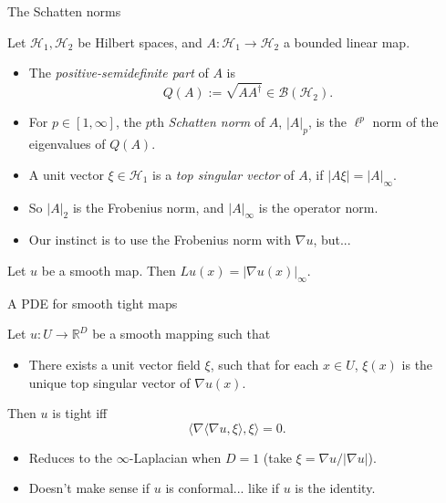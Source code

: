 \documentclass[10pt]{beamer}
\newcommand{\RR}{\mathbb{R}}
\begin{document}
\begin{frame}{The Schatten norms}
\begin{definition}
Let $\mathcal H_1, \mathcal H_2$ be Hilbert spaces, and $A: \mathcal H_1 \to \mathcal H_2$ a bounded linear map.
\begin{itemize}
\item The \emph{positive-semidefinite part} of $A$ is
$$Q(A) := \sqrt{AA^\dagger} \in \mathcal B(\mathcal H_2).$$
\item For $p \in [1, \infty]$, the $p$th \emph{Schatten norm} of $A$, $|A|_p$, is the $\ell^p$ norm of the eigenvalues of $Q(A)$.
\item A unit vector $\xi \in \mathcal H_1$ is a \emph{top singular vector} of $A$, if $|A\xi| = |A|_\infty$.
\end{itemize}
\end{definition}

\begin{itemize}
\item So $|A|_2$ is the Frobenius norm, and $|A|_\infty$ is the operator norm.
\item Our instinct is to use the Frobenius norm with $\nabla u$, but...
\end{itemize}

\begin{lemma}
Let $u$ be a smooth map. Then $Lu(x) = |\nabla u(x)|_\infty$.
\end{lemma}

\end{frame}

\begin{frame}{A PDE for smooth tight maps}
\begin{theorem}
Let $u: U \to \RR^D$ be a smooth mapping such that
\begin{itemize}
\item There exists a unit vector field $\xi$, such that for each $x \in U$, $\xi(x)$ is the unique top singular vector of $\nabla u(x)$.
\end{itemize}
Then $u$ is tight iff 
$$\langle \nabla \langle \nabla u, \xi\rangle, \xi\rangle = 0.$$
\end{theorem}

\begin{itemize}
\item Reduces to the $\infty$-Laplacian when $D = 1$ (take $\xi = \nabla u/|\nabla u|$).
\item Doesn't make sense if $u$ is conformal... like if $u$ is the identity.
\end{itemize}
\end{frame}
\end{document}

